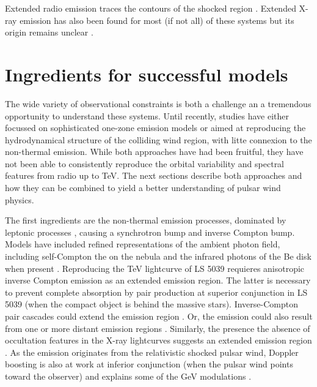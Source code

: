 Extended radio emission traces the contours of the shocked region \citep{2006smqw.confE..52D,2011ApJ...732L..10M}. Extended X-ray emission has also been found for most (if not all) of these systems but its origin remains unclear  \citep{2014AN....335..301K}. 




\section { Ingredients for successful models}


The wide variety of observational constraints is both a challenge an a tremendous opportunity to understand these systems.  Until recently, studies have either focussed on sophisticated one-zone emission models or aimed at reproducing the hydrodynamical  structure of the colliding wind region, with litte connexion to the non-thermal emission. While both approaches have had been fruitful, they have not been able to consistently reproduce the  orbital variability and spectral features from radio up to TeV.   The next sections describe both approaches and how they can be combined to yield a better understanding of pulsar wind physics.

The first ingredients are the non-thermal emission processes, dominated by leptonic processes \citep{2006A&A...456..801D}, causing a synchrotron bump and inverse Compton bump.  Models have included refined  representations of the ambient photon field, including self-Compton the on the nebula  \citep{2010A&A...519A..81C} and the infrared photons of the  Be disk when present  \citep{2012MNRAS.426.3135V}. Reproducing the TeV lightcurve of LS 5039 requieres anisotropic inverse Compton emission  \citep{2008A&A...477..691D} as an extended emission region. The latter is necessary to prevent complete absorption by pair production at  superior conjunction in LS 5039 (when the compact object is behind the massive stars).  Inverse-Compton pair cascades could extend the emission region \citep{2006MNRAS.371.1737B,2010A&A...519A..81C}. Or, the  emission could also result from one or more  distant emission regions \citep{2013A&A...551A..17Z}.  Similarly, the presence the absence of occultation features in the X-ray lightcurves suggests an extended emission region \citep{2007A&A...473..545B,2011MNRAS.411..193S}.  As the emission originates from the relativistic shocked pulsar wind, Doppler boosting is also at work at inferior conjunction (when the pulsar wind points toward the observer) and explains some of the GeV modulations \citep{2010A&A...516A..18D}. 


